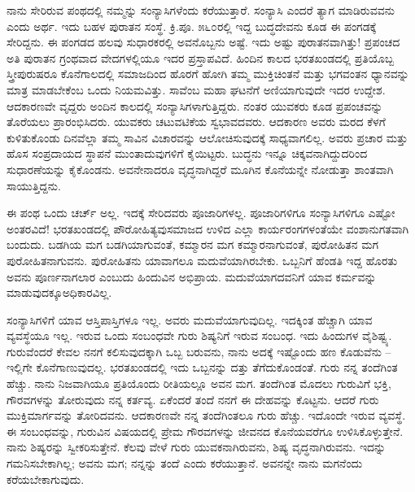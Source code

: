 ನಾನು ಸೇರಿರುವ ಪಂಥದಲ್ಲಿ ನಮ್ಮನ್ನು ಸಂನ್ಯಾಸಿಗಳೆಂದು ಕರೆಯುತ್ತಾರೆ. ಸಂನ್ಯಾಸಿ ಎಂದರೆ ತ್ಯಾಗ ಮಾಡಿರುವವನು ಎಂದು ಅರ್ಥ. ಇದು ಬಹಳ ಪುರಾತನ ಸಂಸ್ಥೆ. ಕ್ರಿ.ಪೂ. ೫೬೦ರಲ್ಲಿ ಇದ್ದ ಬುದ್ಧದೇವನು ಕೂಡ ಈ ಪಂಗಡಕ್ಕೆ ಸೇರಿದ್ದನು. ಈ ಪಂಗಡದ ಹಲವು ಸುಧಾರಕರಲ್ಲಿ ಅವನೊಬ್ಬನು ಅಷ್ಟೆ. ಇದು ಅಷ್ಟು ಪುರಾತನವಾಗಿತ್ತು! ಪ್ರಪಂಚದ ಅತಿ ಪುರಾತನ ಗ್ರಂಥವಾದ ವೇದಗಳಲ್ಲಿಯೂ ಇದರ ಪ್ರಸ್ತಾಪವಿದೆ. ಹಿಂದಿನ ಕಾಲದ ಭರತಖಂಡದಲ್ಲಿ ಪ್ರತಿಯೊಬ್ಬ ಸ್ತ್ರೀಪುರುಷರೂ ಕೊನೆಗಾಲದಲ್ಲಿ ಸಮಾಜದಿಂದ ಹೊರಗೆ ಹೋಗಿ ತಮ್ಮ ಮುಕ್ತಿಚಿಂತನೆ ಮತ್ತು ಭಗವಂತನ ಧ್ಯಾನವನ್ನು ಮಾತ್ರ ಮಾಡಬೇಕೆಂಬ ಒಂದು ನಿಯಮವಿತ್ತು. ಸಾವೆಂಬ ಮಹಾ ಘಟನೆಗೆ ಅಣಿಯಾಗುವುದೇ ಇದರ ಉದ್ದೇಶ. ಆದಕಾರಣವೇ ವೃದ್ದರು ಅಂದಿನ ಕಾಲದಲ್ಲಿ ಸಂನ್ಯಾಸಿಗಳಾಗುತ್ತಿದ್ದರು. ನಂತರ ಯುವಕರು ಕೂಡ ಪ್ರಪಂಚವನ್ನು ತೊರೆಯಲು ಪ್ರಾರಂಭಿಸಿದರು. ಯುವಕರು ಚಟುವಟಿಕೆಯ ಸ್ವಭಾವದವರು. ಆದಕಾರಣ ಅವರು ಮರದ ಕೆಳಗೆ ಕುಳಿತುಕೊಂಡು ದಿನವೆಲ್ಲಾ ತಮ್ಮ ಸಾವಿನ ವಿಚಾರವನ್ನು ಆಲೋಚಿಸುವುದಕ್ಕೆ ಸಾಧ್ಯವಾಗಲಿಲ್ಲ. ಅವರು ಪ್ರಚಾರ ಮತ್ತು ಹೊಸ ಸಂಪ್ರದಾಯದ ಸ್ಥಾಪನೆ ಮುಂತಾದುವುಗಳಿಗೆ ಕೈಯಿಟ್ಟರು. ಬುದ್ಧನು ಇನ್ನೂ ಚಿಕ್ಕವನಾಗಿದ್ದುದರಿಂದ ಸುಧಾರಣೆಯನ್ನು ಕೈಕೊಂಡನು. ಅವನೇನಾದರೂ ವೃದ್ಧನಾಗಿದ್ದರೆ ಮೂಗಿನ ಕೊನೆಯನ್ನೇ ನೋಡುತ್ತಾ ಶಾಂತವಾಗಿ ಸಾಯುತ್ತಿದ್ದನು.

ಈ ಪಂಥ ಒಂದು ಚರ್ಚ್ ಅಲ್ಲ. ಇದಕ್ಕೆ ಸೇರಿದವರು ಪೂಜಾರಿಗಳಲ್ಲ. ಪೂಜಾರಿಗಳಿಗೂ ಸಂನ್ಯಾಸಿಗಳಿಗೂ ಎಷ್ಟೋ ಅಂತರವಿದೆ! ಭರತಖಂಡದಲ್ಲಿ ಪೌರೋಹಿತ್ಯವು\break ಸಮಾಜದ ಉಳಿದ ಎಲ್ಲಾ ಕಾರ್ಯರಂಗಗಳಂತೆಯೇ ವಂಶಾನುಗತವಾಗಿ ಬಂದುದು. ಬಡಗಿಯ ಮಗ ಬಡಗಿಯಾಗುವಂತೆ, ಕಮ್ಮಾರನ ಮಗ ಕಮ್ಮಾರನಾಗುವಂತೆ, ಪುರೋಹಿತನ ಮಗ ಪುರೋಹಿತನಾಗುವನು. ಪುರೋಹಿತನು ಯಾವಾಗಲೂ ಮದುವೆಯಾಗಿರಬೇಕು. ಒಬ್ಬನಿಗೆ ಹೆಂಡತಿ ಇದ್ದ ಹೊರತು ಅವನು ಪೂರ್ಣನಾಗಲಾರ ಎಂಬುದು ಹಿಂದುವಿನ ಅಭಿಪ್ರಾಯ. ಮದುವೆಯಾಗದವನಿಗೆ ಯಾವ ಕರ್ಮವನ್ನು ಮಾಡುವುದಕ್ಕೂ\break ಅಧಿಕಾರವಿಲ್ಲ.

ಸಂನ್ಯಾಸಿಗಳಿಗೆ ಯಾವ ಆಸ್ತಿಪಾಸ್ತಿಗಳೂ ಇಲ್ಲ. ಅವರು ಮದುವೆಯಾಗುವುದಿಲ್ಲ. ಇದಕ್ಕಿಂತ ಹೆಚ್ಚಾಗಿ ಯಾವ ವ್ಯವಸ್ಥೆಯೂ ಇಲ್ಲ. ಇರುವ ಒಂದು ಸಂಬಂಧವೇ ಗುರು ಶಿಷ್ಯನಿಗೆ ಇರುವ ಸಂಬಂಧ. ಇದು ಹಿಂದುಗಳ ವೈಶಿಷ್ಟ್ಯ. ಗುರುವೆಂದರೆ ಕೇವಲ ನನಗೆ ಕಲಿಸುವುದಕ್ಕಾಗಿ ಒಬ್ಬ ಬರುವನು, ನಾನು ಅದಕ್ಕೆ ಇಷ್ಟೊಂದು ಹಣ ಕೊಡುವೆನು – ಇಲ್ಲಿಗೇ ಕೊನೆಗಾಣುವುದಲ್ಲ. ಭರತಖಂಡದಲ್ಲಿ ಇದು ಒಬ್ಬನನ್ನು ದತ್ತು ತೆಗೆದುಕೊಂಡಂತೆ. ಗುರು ನನ್ನ ತಂದೆಗಿಂತ ಹೆಚ್ಚು. ನಾನು ನಿಜವಾಗಿಯೂ ಪ್ರತಿಯೊಂದು ರೀತಿಯಲ್ಲೂ ಅವನ ಮಗ. ತಂದೆಗಿಂತ ಮೊದಲು ಗುರುವಿಗೆ ಭಕ್ತಿ, ಗೌರವಗಳನ್ನು ತೋರುವುದು ನನ್ನ ಕರ್ತವ್ಯ. ಏಕೆಂದರೆ ತಂದೆ ನನಗೆ ಈ ದೇಹವನ್ನು ಕೊಟ್ಟನು. ಆದರೆ ಗುರು ಮುಕ್ತಿಮಾರ್ಗವನ್ನು ತೋರಿದವನು. ಆದಕಾರಣವೇ ನನ್ನ ತಂದೆಗಿಂತಲೂ ಗುರು ಹೆಚ್ಚು. ಇದೊಂದೇ ಇರುವ ವ್ಯವಸ್ಥೆ. ಈ ಸಂಬಂಧವನ್ನು, ಗುರುವಿನ ವಿಷಯದಲ್ಲಿ ಪ್ರೇಮ ಗೌರವಗಳನ್ನು ಜೀವನದ ಕೊನೆಯವರೆಗೂ ಉಳಿಸಿಕೊಳ್ಳುತ್ತೇನೆ. ನಾನು ಶಿಷ್ಯರನ್ನು ಸ್ವೀಕರಿಸುತ್ತೇನೆ. ಕೆಲವು ವೇಳೆ ಗುರು ಯುವಕನಾಗಿರುವನು, ಶಿಷ್ಯ ವೃದ್ಧನಾಗಿರುವನು. ಇದನ್ನು ಗಮನಿಸಬೇಕಾಗಿಲ್ಲ; ಅವನು ಮಗ; ನನ್ನನ್ನು ತಂದೆ ಎಂದು ಕರೆಯುತ್ತಾನೆ. ಅವನನ್ನೇ ನಾನು ಮಗನೆಂದು ಕರೆಯಬೇಕಾಗುವುದು.


